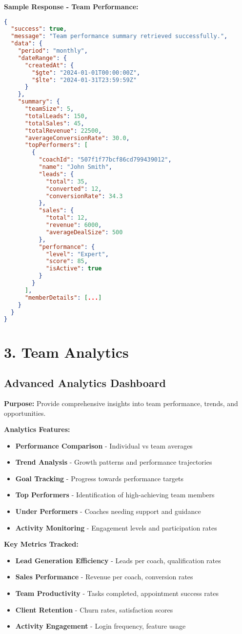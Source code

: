 \documentclass[12pt,a4paper]{article}
\newcommand{\samplecode}[1]{\begin{lstlisting}[language=JSON]#1\end{lstlisting}}
\begin{document}
\textbf{Sample Response - Team Performance:}
\samplecode{
{
  "success": true,
  "message": "Team performance summary retrieved successfully.",
  "data": {
    "period": "monthly",
    "dateRange": {
      "createdAt": {
        "$gte": "2024-01-01T00:00:00Z",
        "$lte": "2024-01-31T23:59:59Z"
      }
    },
    "summary": {
      "teamSize": 5,
      "totalLeads": 150,
      "totalSales": 45,
      "totalRevenue": 22500,
      "averageConversionRate": 30.0,
      "topPerformers": [
        {
          "coachId": "507f1f77bcf86cd799439012",
          "name": "John Smith",
          "leads": {
            "total": 35,
            "converted": 12,
            "conversionRate": 34.3
          },
          "sales": {
            "total": 12,
            "revenue": 6000,
            "averageDealSize": 500
          },
          "performance": {
            "level": "Expert",
            "score": 85,
            "isActive": true
          }
        }
      ],
      "memberDetails": [...]
    }
  }
}
}

\section{3. Team Analytics}

\subsection{Advanced Analytics Dashboard}
\textbf{Purpose:} Provide comprehensive insights into team performance, trends, and opportunities.

\textbf{Analytics Features:}
\begin{itemize}
    \item \textbf{Performance Comparison} - Individual vs team averages
    \item \textbf{Trend Analysis} - Growth patterns and performance trajectories
    \item \textbf{Goal Tracking} - Progress towards performance targets
    \item \textbf{Top Performers} - Identification of high-achieving team members
    \item \textbf{Under Performers} - Coaches needing support and guidance
    \item \textbf{Activity Monitoring} - Engagement levels and participation rates
\end{itemize}

\textbf{Key Metrics Tracked:}
\begin{itemize}
    \item \textbf{Lead Generation Efficiency} - Leads per coach, qualification rates
    \item \textbf{Sales Performance} - Revenue per coach, conversion rates
    \item \textbf{Team Productivity} - Tasks completed, appointment success rates
    \item \textbf{Client Retention} - Churn rates, satisfaction scores
    \item \textbf{Activity Engagement} - Login frequency, feature usage
\end{itemize}
\end{document}
